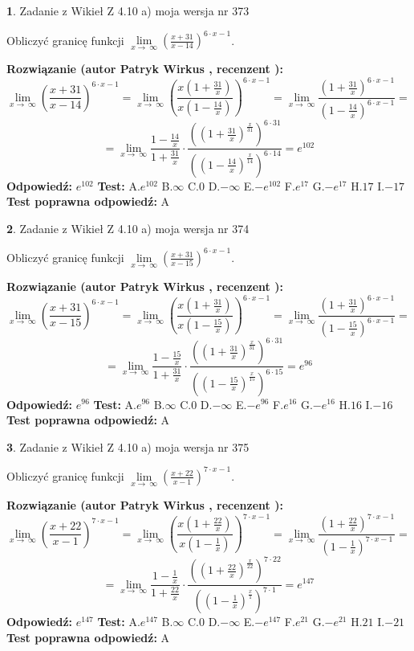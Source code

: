 \documentclass[12pt, a4paper]{article}
\theoremstyle{definition} %
\newtheorem{zad}{}
\newcommand{\zadStart}[1]{\begin{zad}#1\newline}
\newcommand{\zadStop}{\end{zad}}
\newcommand{\rozwStart}[2]{\noindent \textbf{Rozwiązanie (autor #1 , recenzent #2): }\newline}
\newcommand{\rozwStop}{\newline}
\newcommand{\odpStart}{\noindent \textbf{Odpowiedź:}\newline}
\newcommand{\odpStop}{\newline}
\newcommand{\testStart}{\noindent \textbf{Test:}\newline}
\newcommand{\testStop}{\newline}
\newcommand{\kluczStart}{\noindent \textbf{Test poprawna odpowiedź:}\newline}
\newcommand{\kluczStop}{\newline}
\begin{document}
\zadStart{Zadanie z Wikieł Z 4.10 a) moja wersja nr 373}

Obliczyć granicę funkcji  $\lim\limits_{x\to\ \infty}(\frac{x+31}{x-14})^{6\cdot x-1}$.
\zadStop
\rozwStart{Patryk Wirkus}{}
$$\lim\limits_{x\to\ \infty}(\frac{x+31}{x-14})^{6\cdot x-1} = \lim\limits_{x\to\ \infty}(\frac{x(1+\frac{31}{x})}{x(1-\frac{14}{x})})^{6\cdot x-1}=\lim\limits_{x\to\ \infty}\frac{(1+\frac{31}{x})^{6\cdot x-1}}{(1-\frac{14}{x})^{6\cdot x-1}}=$$
$$=\lim\limits_{x\to\ \infty}\frac{1-\frac{14}{x}}{1+\frac{31}{x}}\cdot\frac{((1+\frac{31}{x})^{\frac{x}{31}})^{6\cdot31}}{((1-\frac{14}{x})^{\frac{x}{14}})^{6\cdot14}}=e^{102}$$
\rozwStop
\odpStart
$e^{102}$
\odpStop
\testStart
A.$e^{102}$ B.$\infty$ C.$0$ D.$-\infty$ E.$-e^{102}$
F.$e^{17}$ G.$-e^{17}$
H.$17$
I.$-17$
\testStop
\kluczStart
A
\kluczStop



\zadStart{Zadanie z Wikieł Z 4.10 a) moja wersja nr 374}

Obliczyć granicę funkcji  $\lim\limits_{x\to\ \infty}(\frac{x+31}{x-15})^{6\cdot x-1}$.
\zadStop
\rozwStart{Patryk Wirkus}{}
$$\lim\limits_{x\to\ \infty}(\frac{x+31}{x-15})^{6\cdot x-1} = \lim\limits_{x\to\ \infty}(\frac{x(1+\frac{31}{x})}{x(1-\frac{15}{x})})^{6\cdot x-1}=\lim\limits_{x\to\ \infty}\frac{(1+\frac{31}{x})^{6\cdot x-1}}{(1-\frac{15}{x})^{6\cdot x-1}}=$$
$$=\lim\limits_{x\to\ \infty}\frac{1-\frac{15}{x}}{1+\frac{31}{x}}\cdot\frac{((1+\frac{31}{x})^{\frac{x}{31}})^{6\cdot31}}{((1-\frac{15}{x})^{\frac{x}{15}})^{6\cdot15}}=e^{96}$$
\rozwStop
\odpStart
$e^{96}$
\odpStop
\testStart
A.$e^{96}$ B.$\infty$ C.$0$ D.$-\infty$ E.$-e^{96}$
F.$e^{16}$ G.$-e^{16}$
H.$16$
I.$-16$
\testStop
\kluczStart
A
\kluczStop



\zadStart{Zadanie z Wikieł Z 4.10 a) moja wersja nr 375}

Obliczyć granicę funkcji  $\lim\limits_{x\to\ \infty}(\frac{x+22}{x-1})^{7\cdot x-1}$.
\zadStop
\rozwStart{Patryk Wirkus}{}
$$\lim\limits_{x\to\ \infty}(\frac{x+22}{x-1})^{7\cdot x-1} = \lim\limits_{x\to\ \infty}(\frac{x(1+\frac{22}{x})}{x(1-\frac{1}{x})})^{7\cdot x-1}=\lim\limits_{x\to\ \infty}\frac{(1+\frac{22}{x})^{7\cdot x-1}}{(1-\frac{1}{x})^{7\cdot x-1}}=$$
$$=\lim\limits_{x\to\ \infty}\frac{1-\frac{1}{x}}{1+\frac{22}{x}}\cdot\frac{((1+\frac{22}{x})^{\frac{x}{22}})^{7\cdot22}}{((1-\frac{1}{x})^{\frac{x}{1}})^{7\cdot1}}=e^{147}$$
\rozwStop
\odpStart
$e^{147}$
\odpStop
\testStart
A.$e^{147}$ B.$\infty$ C.$0$ D.$-\infty$ E.$-e^{147}$
F.$e^{21}$ G.$-e^{21}$
H.$21$
I.$-21$
\testStop
\kluczStart
A
\kluczStop
\end{document}
